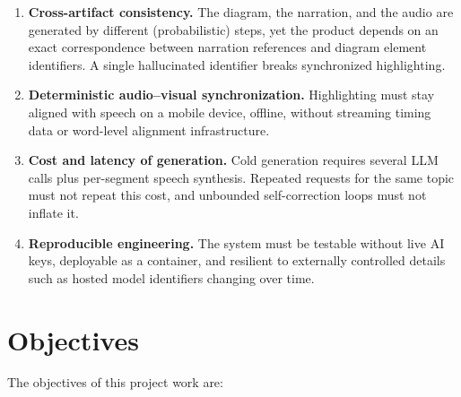 \begin{enumerate}
  \item \textbf{Cross-artifact consistency.} The diagram, the narration, and
        the audio are generated by different (probabilistic) steps, yet the
        product depends on an exact correspondence between narration
        references and diagram element identifiers. A single hallucinated
        identifier breaks synchronized highlighting.
  \item \textbf{Deterministic audio--visual synchronization.} Highlighting
        must stay aligned with speech on a mobile device, offline, without
        streaming timing data or word-level alignment infrastructure.
  \item \textbf{Cost and latency of generation.} Cold generation requires
        several LLM calls plus per-segment speech synthesis. Repeated requests
        for the same topic must not repeat this cost, and unbounded
        self-correction loops must not inflate it.
  \item \textbf{Reproducible engineering.} The system must be testable without
        live AI keys, deployable as a container, and resilient to externally
        controlled details such as hosted model identifiers changing over
        time.
\end{enumerate}

\section{Objectives}
\label{sec:objectives}

The objectives of this project work are:

